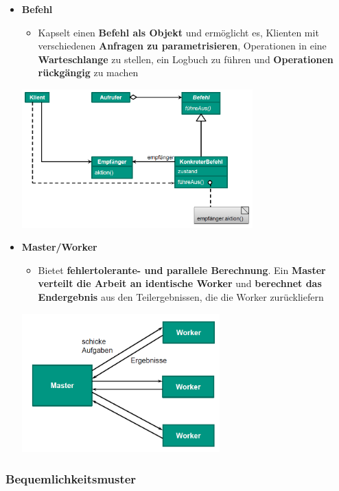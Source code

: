 \documentclass[parskip=full, 12pt]{scrartcl}
\begin{document}
				\begin{itemize}
					\item \textbf{Befehl}
					\begin{itemize}
						\item Kapselt einen \textbf{Befehl als Objekt} und ermöglicht es, Klienten mit verschiedenen \textbf{Anfragen zu parametrisieren}, Operationen in eine \textbf{Warteschlange} zu stellen, ein Logbuch zu führen und \textbf{Operationen rückgängig} zu machen
					\end{itemize}
					\begin{center}
						\includegraphics[width=0.7\textwidth]{../images/befehl.png}
					\end{center}
					\item \textbf{Master/Worker}
					\begin{itemize}
						\item Bietet \textbf{fehlertolerante- und parallele Berechnung}. Ein \textbf{Master verteilt die Arbeit an identische Worker} und \textbf{berechnet das Endergebnis} aus den Teilergebnissen, die die Worker zurückliefern
					\end{itemize}
					\begin{center}
						\includegraphics[width=0.6\textwidth]{../images/masterWorker.png}
					\end{center}
				\end{itemize}
			
			\subsubsection{Bequemlichkeitsmuster}
			
\end{document}

